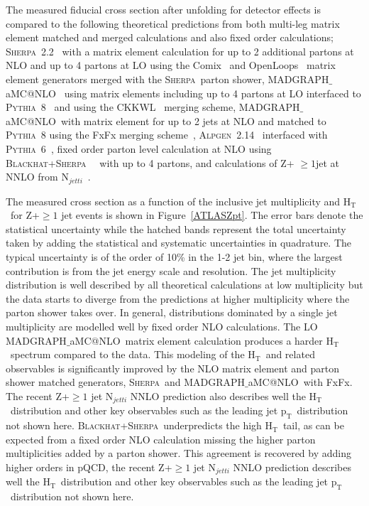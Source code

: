 \documentclass[a4paper,11pt,notoc]{article}
\makeatletter
\newcommand{\pt}{\ensuremath{\mathrm{p_T}}}
\newcommand{\Ht}{\ensuremath{\mathrm{H_T}}}
\newcommand{\PYTHIA}{\textsc{Pythia}}
\newcommand{\SHERPA}{\textsc{Sherpa}}
\newcommand{\BLACKHAT}{\textsc{Blackhat}}
\newcommand{\ALPGEN}{\textsc{Alpgen}}
\newcommand{\MGNLO}{MADGRAPH$\_$aMC@NLO}
\makeatother
\begin{document}
The measured fiducial cross section after unfolding for detector effects is compared to the following theoretical predictions from both multi-leg matrix element matched and merged calculations and also fixed order calculations; \SHERPA\ 2.2~\cite{Gleisberg:2008ta} with a matrix element calculation for up to 2 additional partons at NLO and up to 4 partons at LO using the Comix~\cite{Gleisberg:2008fv} and OpenLoops~\cite{Cascioli:2011va} matrix element generators merged with the \SHERPA\ parton shower, \MGNLO~\cite{Alwall:2014hca} using matrix elements including up to 4 partons at LO interfaced to \PYTHIA\ 8~\cite{Sjostrand:2007gs} and using the CKKWL~\cite{Lonnblad:2001iq} merging scheme, \MGNLO\ with matrix element for up to 2 jets at NLO and matched to \PYTHIA\ 8 using the FxFx merging scheme~\cite{Frederix:2012ps}, \ALPGEN\ 2.14~\cite{Mangano:2002ea} interfaced with \PYTHIA\ 6~\cite{Sjostrand:2006za}, fixed order parton level calculation at NLO using \BLACKHAT+\SHERPA~\cite{Berger:2010vm}~\cite{Ita:2011wn} with up to 4 partons, and calculations of Z+ $\ge 1$jet at NNLO from N$_{jetti}$~\cite{Boughezal:2015dva}. 

The measured cross section as a function of the inclusive jet multiplicity and \Ht\ for Z+$\ge 1$ jet events is shown in Figure~\ref{ATLASZpt}.
The error bars denote the statistical uncertainty while the hatched bands represent the total uncertainty taken by adding the statistical and systematic uncertainties in quadrature. The typical uncertainty is of the order of 10\% in the 1-2 jet bin, where the largest contribution is from the jet energy scale and resolution. 
The jet multiplicity distribution is well described by all theoretical calculations at low multiplicity but the data starts to diverge from the predictions at higher multiplicity where the parton shower takes over. 
In general, distributions dominated by a single jet multiplicity are modelled well by fixed order NLO calculations. The LO \MGNLO\ matrix element calculation produces a harder \Ht\ spectrum compared to the data. This modeling of the \Ht\ and related observables is significantly improved by the NLO matrix element and parton shower matched generators, \SHERPA\ and \MGNLO\ with FxFx. The recent Z+$\ge 1$ jet N$_{jetti}$ NNLO prediction also describes well the \Ht\ distribution and other key observables such as the leading jet \pt\ distribution not shown here. \BLACKHAT+\SHERPA\ underpredicts the high \Ht\ tail, as can be expected from a fixed order NLO calculation missing the higher parton multiplicities added by a parton shower. This agreement is recovered by adding higher orders in pQCD, the recent Z+$\ge 1$ jet N$_{jetti}$ NNLO prediction describes well the \Ht\ distribution and other key observables such as the leading jet \pt\ distribution not shown here.
\end{document}
